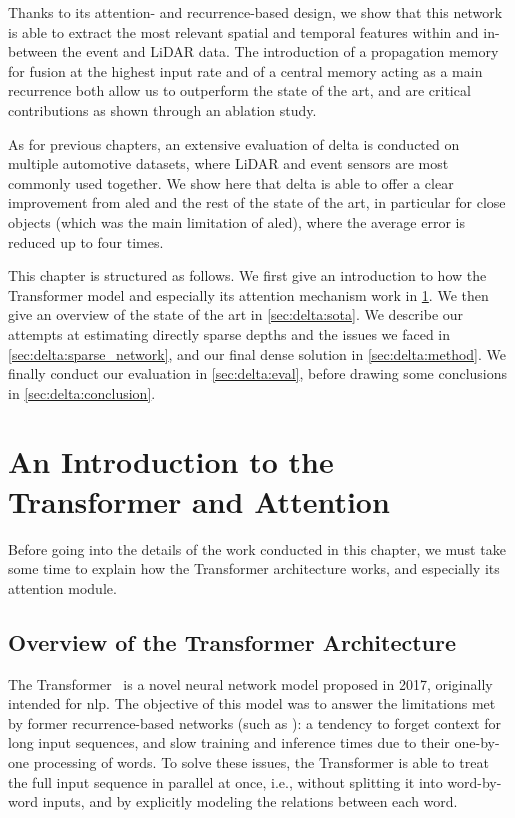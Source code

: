 Thanks to its attention- and recurrence-based design, we show that this network is able to extract the most relevant spatial and temporal features within and in-between the event and LiDAR data. The introduction of a propagation memory for fusion at the highest input rate and of a central memory acting as a main recurrence both allow us to outperform the state of the art, and are critical contributions as shown through an ablation study.

As for previous chapters, an extensive evaluation of \acrshort{delta} is conducted on multiple automotive datasets, where LiDAR and event sensors are most commonly used together. We show here that \acrshort{delta} is able to offer a clear improvement from \acrshort{aled} and the rest of the state of the art, in particular for close objects (which was the main limitation of \acrshort{aled}), where the average error is reduced up to four times.

This chapter is structured as follows. We first give an introduction to how the Transformer model and especially its attention mechanism work in \cref{sec:delta:intro_transf_att}. We then give an overview of the state of the art in \cref{sec:delta:sota}. We describe our attempts at estimating directly sparse depths and the issues we faced in \cref{sec:delta:sparse_network}, and our final dense solution in \cref{sec:delta:method}. We finally conduct our evaluation in \cref{sec:delta:eval}, before drawing some conclusions in \cref{sec:delta:conclusion}.


\section{An Introduction to the Transformer and Attention}\label{sec:delta:intro_transf_att}
Before going into the details of the work conducted in this chapter, we must take some time to explain how the Transformer architecture works, and especially its attention module.

\subsection{Overview of the Transformer Architecture}
The Transformer~\cite{Vaswani2017AttentionIA} is a novel neural network model proposed in 2017, originally intended for \acrfull{nlp}. The objective of this model was to answer the limitations met by former recurrence-based networks (such as ): a tendency to forget context for long input sequences, and slow training and inference times due to their one-by-one processing of words. To solve these issues, the Transformer is able to treat the full input sequence in parallel at once, i.e., without splitting it into word-by-word inputs, and by explicitly modeling the relations between each word.

